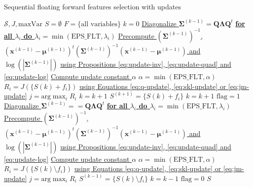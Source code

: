 \documentclass[a4paper,11pt,DIV=16,abstracton]{scrartcl}
\begin{document}
    \begin{algorithm}
    \caption{Sequential floating forward features selection with updates\label{alg:sffs-update}}
    {\fontsize{8}{8}\selectfont
    \begin{algorithmic}[1]
    \REQUIRE $\mathcal{S},J,\text{maxVar}$
    \STATE $S=\emptyset$
    \STATE $F=\text{\{all variables\}}$
    \STATE $k=0$
    \STATE \underline{Diagonalize $\boldsymbol{\Sigma}^{(k-1)} = \mathbf{Q} \boldsymbol{\Lambda} \mathbf{Q}^t$}
    \STATE \underline{\bfseries{for all} $\lambda_i$ \bfseries{do} $\lambda_i = \min (\text{EPS\_FLT},\lambda_i)$}
    \STATE \underline{Precompute $(\boldsymbol{\Sigma}^{(k-1)})^{-1}$, $(\mathbf{x}^{(k-1)} - \boldsymbol{\mu}^{(k-1)})^t (\boldsymbol{\Sigma}^{(k-1)})^{-1} (\mathbf{x}^{(k-1)} - \boldsymbol{\mu}^{(k-1)})$ and $\log \left(|\boldsymbol{\Sigma}^{(k-1)}|\right)$} \underline{using Propositions \ref{eq:update-inv}, \ref{eq:update-quad} and \ref{eq:update-log}}
    \STATE \underline{Compute update constant $\alpha$}
    \STATE \underline{$\alpha = \min (\text{EPS\_FLT},\alpha)$}
    \STATE $R_i = J(\{S{(k)} + f_i\})$ \underline{using Equations \ref{eq:q-update}, \ref{eq:skl-update} or \ref{eq:jm-update}}
    \ENDFOR
    \STATE $j=\text{arg} \max_{i} R_i$
    \STATE $k=k+1$
    \ELSE
    \STATE $S^{(k+1)} = \{S{(k)} + f_i\}$
    \STATE $k=k+1$
    \STATE $\text{flag}=1$
    \STATE \underline{Diagonalize $\boldsymbol{\Sigma}^{(k-1)} = = \mathbf{Q} \boldsymbol{\Lambda} \mathbf{Q}^t$}
    \STATE \underline{\bfseries{for all} $\lambda_i$ \bfseries{do} $\lambda_i = \min (\text{EPS\_FLT},\lambda_i)$}
    \STATE \underline{Precompute $(\boldsymbol{\Sigma}^{(k-1)})^{-1}$, $(\mathbf{x}^{(k-1)} - \boldsymbol{\mu}^{(k-1)})^t (\boldsymbol{\Sigma}^{(k-1)})^{-1} (\mathbf{x}^{(k-1)} - \boldsymbol{\mu}^{(k-1)})$ and $\log \left(|\boldsymbol{\Sigma}^{(k-1)}|\right)$} \underline{using Propositions \ref{eq:update-inv}, \ref{eq:update-quad} and \ref{eq:update-log}}
    \STATE \underline{Compute update constant $\alpha$}
    \STATE \underline{$\alpha = \min (\text{EPS\_FLT},\alpha)$}
    \STATE $R_i = J(\{S{(k)}\setminus f_i\})$ \underline{using Equations \ref{eq:q-update}, \ref{eq:skl-update} or \ref{eq:jm-update}}
    \ENDFOR
    \STATE $j=\text{arg} \max_{i} R_i$
    \STATE $S^{(k-1)} = \{S{(k)} \setminus f_i\}$
    \STATE $k=k-1$
    \ELSE
    \STATE $\text{flag}=0$
    \ENDIF
    \ENDWHILE
    \ENDIF
    \ENDWHILE
    \RETURN $S$
    \end{algorithmic}
    }
    \end{algorithm}
\end{document}
